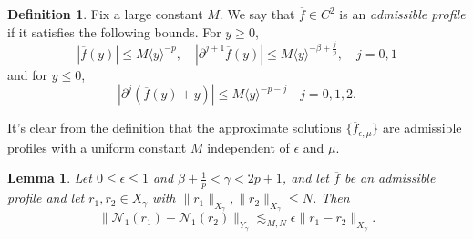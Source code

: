 \documentclass[11pt]{amsart}
\newtheorem{lemma}[theorem]{Lemma}
\theoremstyle{definition}
\newtheorem{definition}[theorem]{Definition}
\theoremstyle{remark}
\numberwithin{equation}{section}
\newcommand{\mc}[1]{\mathcal{#1}}
\newcommand{\ov}[1]{\overline{#1}}
\newcommand{\ang}[1]{\langle #1 \rangle}
\begin{document}
\begin{definition}\label{def:nonlinear_admissible_profile}
    Fix a large constant $M$. We say that $\ov{f} \in C^2$ is an \emph{admissible profile} if it satisfies the following bounds. For $y \geq 0$,
    \begin{equation}\label{eq:nonlinear_admissible_profile_plus}|\ov{f}(y)| \leq M \ang{y}^{-p}, \quad |\partial^{j+1} \ov{f}(y)| \leq M \ang{y}^{-\beta + \frac{j}{p}}, \quad j = 0,1\end{equation}
    and for $y \leq 0$, 
    \begin{equation}\label{eq:nonlinear_admissible_profile_minus}| \partial^j (\ov{f}(y) + y)| \leq M \ang{y}^{-p - j} \quad j = 0,1, 2.\end{equation}
\end{definition}

It's clear from the definition that the approximate solutions $\{\ov{f}_{\epsilon, \mu}\}$ are admissible profiles with a uniform constant $M$ independent of $\epsilon$ and $\mu$.


\begin{lemma}\label{lem:N1}
Let $0\le\epsilon\le1$ and $\beta + \frac{1}{p} < \gamma < 2p + 1$, and let $\ov{f}$ be an admissible profile and let $r_1, r_2 \in X_\gamma$ with $\|r_1\|_{X_\gamma}, \|r_2\|_{X_\gamma} \leq N$. Then 
\[\|\mc{N}_1(r_1) - \mc{N}_1(r_2)\|_{Y_\gamma} \lesssim_{M,N} \epsilon \|r_1 - r_2\|_{X_\gamma}.\]
\end{lemma}
\end{document}
